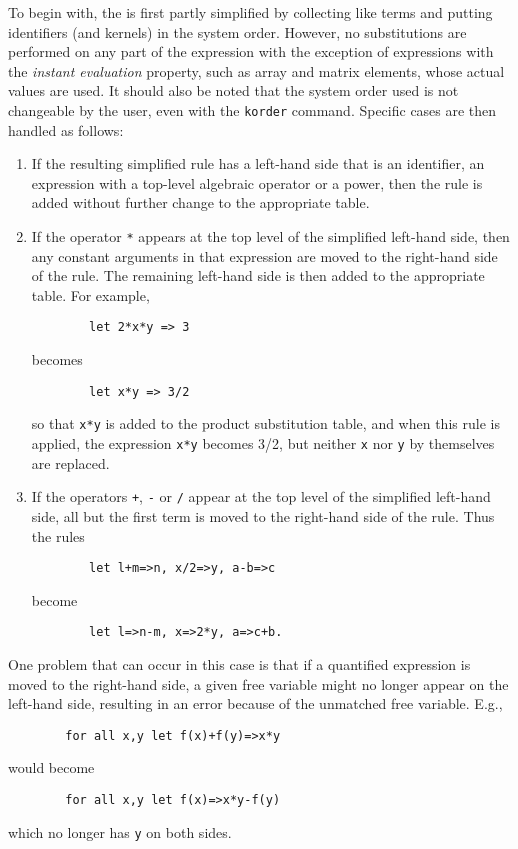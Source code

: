 To begin with, the  is first partly
simplified by collecting like terms and putting identifiers (and kernels)
in the system order.  However, no substitutions are performed on any part
of the expression with the exception of expressions with the \emph{instant
evaluation} property, such as array and matrix elements, whose actual
values are used.  It should also be noted that the system order used is
not changeable by the user, even with the \texttt{korder} command.  Specific
cases are then handled as follows:
\begin{enumerate}
\item If the resulting simplified rule has a left-hand side that is an
identifier, an expression with a top-level algebraic operator or a power,
then the rule is added without further change to the appropriate table.

\item If the operator \texttt{*} appears at the top level of the simplified left-hand
side, then any constant arguments in that expression are moved to the
right-hand side of the rule.  The remaining left-hand side is then added
to the appropriate table.  For example,
\begin{verbatim}
        let 2*x*y => 3
\end{verbatim}
becomes
\begin{verbatim}
        let x*y => 3/2
\end{verbatim}
so that \texttt{x*y} is added to the product substitution table, and
when this rule is applied, the expression \texttt{x*y} becomes 3/2,
but neither \texttt{x} nor \texttt{y} by themselves are replaced.

\item If the operators \texttt{+}, \texttt{-} or \texttt{/} appear at the top level
of the simplified left-hand side, all but the first term is moved to the
right-hand side of the rule.  Thus the rules
\begin{verbatim}
        let l+m=>n, x/2=>y, a-b=>c
\end{verbatim}
become
\begin{verbatim}
        let l=>n-m, x=>2*y, a=>c+b.
\end{verbatim}
\end{enumerate}
One problem that can occur in this case is that if a quantified expression
is moved to the right-hand side, a given free variable might no longer
appear on the left-hand side, resulting in an error because of the
unmatched free variable. E.g.,
\begin{verbatim}
        for all x,y let f(x)+f(y)=>x*y
\end{verbatim}
would become
\begin{verbatim}
        for all x,y let f(x)=>x*y-f(y)
\end{verbatim}
which no longer has \texttt{y} on both sides.

